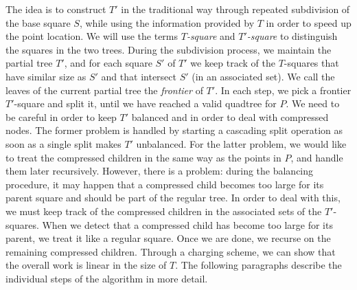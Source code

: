 \documentclass[11pt]{paper}
\begin{document}
    The idea is to construct $T'$ in the traditional way through
    repeated subdivision of the base square $S$, while using the information
    provided by $T$ in order to speed up the point location. 
    We will use the terms \emph{$T$-square} and \emph{$T'$-square} to
    distinguish the squares in the two trees.
    During the subdivision process, we maintain the partial tree $T'$, 
    and for each square $S'$ of $T'$ 
    we keep track of the $T$-squares that have similar size
    as $S'$ and that intersect $S'$ (in an associated set). 
    We call the leaves of the current partial tree the
    \emph{frontier} of $T'$. In each step, we
    pick a frontier $T'$-square and split it, until we have reached
    a valid quadtree for $P$. 
    We need to be careful in order to keep $T'$ 
    balanced and in order to deal with compressed nodes. The former problem
    is handled by starting a cascading split operation as soon as 
    a single split makes $T'$ unbalanced.
    For the latter problem, we would like to treat the compressed children
      in the same way as the points in $P$, and handle them
      later recursively. However, there is a problem: during the
      balancing procedure, it may happen that a compressed child becomes
      too large for its parent square and should be part of the regular
      tree. In order to deal with this, we must keep track of the compressed
      children in the associated sets of the $T'$-squares. When we detect
      that a compressed child has become too large for its parent, we treat
      it like a regular square. Once we are done, we recurse on the 
      remaining compressed children. Through a charging scheme, we can show
      that the overall work is linear in the size of $T$.
      The following paragraphs describe the individual steps of the algorithm 
      in more detail.
\end{document}
